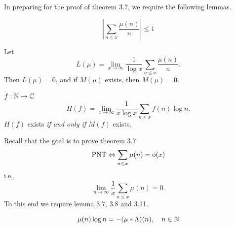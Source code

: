 \documentclass[twoside, openright, fontsize=10pt, headings=big]{scrbook}
\begin{document}
In preparing for the proof of theorem 3.7, we require the following lemmas.
\begin{lemma}{}{}
    \[
        \left|\sum_{n\leq x}\frac{\mu(n)}{n}\right|\leq1
    \]
\end{lemma}
\begin{corollary}{}{}
    Let 
    \[
        L(\mu)=\lim_{x\to\infty}\frac{1}{\log x}\sum_{n\leq x}\frac{\mu(n)}{n}.
    \]
    Then $L(\mu)=0$, and if $M(\mu)$ exists, then $M(\mu)=0$. 
\end{corollary}
\begin{lemma}{}{}
    $f:\mathbb{N}\to\mathbb{C}$
    \[
        H(f)=\lim_{x\to\infty}\frac{1}{x\log x}\sum_{n\leq x}f(n)\log n.    
    \]
    $H(f)$ exists \textit{if and only if} $M(f)$ exists.
\end{lemma}
Recall that the goal is to prove theorem 3.7
\[
    \text{PNT}\Leftrightarrow\sum_{n\leq x}\mu(n)=\text{o}(x)
\]
i.e.,
\[
    \lim_{n\to\infty}\frac{1}{x}\sum_{n\leq x}\mu(n)=0.
\]
To this end we require lemma 3.7, 3.8 and 3.11.
\begin{lemma}{}{}
    \[
        \mu(n)\log n=-(\mu\ast\Lambda)(n),\quad n\in\mathbb{N}
    \]
\end{lemma}
\end{document}
